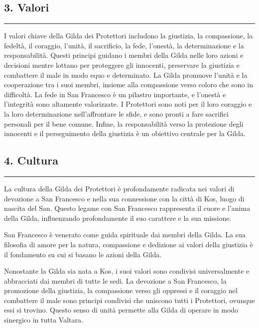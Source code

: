 \subsection{3. Valori}\label{valori}

\begin{center}\rule{0.5\linewidth}{0.5pt}\end{center}

I valori chiave della Gilda dei Protettori includono la giustizia, la
compassione, la fedeltà, il coraggio, l'unità, il sacrificio, la fede,
l'onestà, la determinazione e la responsabilità. Questi principi guidano
i membri della Gilda nelle loro azioni e decisioni mentre lottano per
proteggere gli innocenti, preservare la giustizia e combattere il male
in modo equo e determinato. La Gilda promuove l'unità e la cooperazione
tra i suoi membri, insieme alla compassione verso coloro che sono in
difficoltà. La fede in San Francesco è un pilastro importante, e
l'onestà e l'integrità sono altamente valorizzate. I Protettori sono
noti per il loro coraggio e la loro determinazione nell'affrontare le
sfide, e sono pronti a fare sacrifici personali per il bene comune.
Infine, la responsabilità verso la protezione degli innocenti e il
perseguimento della giustizia è un obiettivo centrale per la Gilda.

\subsection{4. Cultura}\label{cultura}

\begin{center}\rule{0.5\linewidth}{0.5pt}\end{center}

La cultura della Gilda dei Protettori è profondamente radicata nei
valori di devozione a San Francesco e nella sua connessione con la città
di Kos, luogo di nascita del San. Questo legame con San Francesco
rappresenta il cuore e l'anima della Gilda, influenzando profondamente
il suo carattere e la sua missione.

San Francesco è venerato come guida spirituale dai membri della Gilda.
La sua filosofia di amore per la natura, compassione e dedizione ai
valori della giustizia è il fondamento su cui si basano le azioni della
Gilda.

Nonostante la Gilda sia nata a Kos, i suoi valori sono condivisi
universalmente e abbracciati dai membri di tutte le sedi. La devozione a
San Francesco, la promozione della giustizia, la compassione verso gli
oppressi e il coraggio nel combattere il male sono principi condivisi
che uniscono tutti i Protettori, ovunque essi si trovino. Questo senso
di unità permette alla Gilda di operare in modo sinergico in tutta
Valtara.

